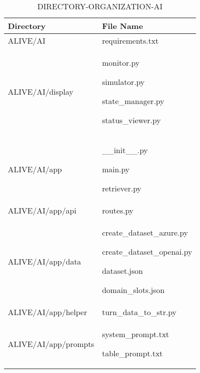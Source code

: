 \documentclass[conference]{IEEEtran}
\begin{document}
\begin{table}[h]
\caption{DIRECTORY-ORGANIZATION-AI}
\def\arraystretch{1.24} \small
    \begin{tabular}{|p{3.9cm}|p{4cm}|}
\hline
        Directory & File Name \\ \hline
        
          ALIVE/AI & 
          requirements.txt \\ \hline

          ALIVE/AI/display \par  &
           monitor.py \par 
           simulator.py \par
          state\_manager.py \par
          status\_viewer.py \\ \hline
          
          ALIVE/AI/app  &
          \_\_init\_\_.py \par 
          main.py \par retriever.py \\ \hline
          
          ALIVE/AI/app/api &
          routes.py \\ \hline
          
          ALIVE/AI/app/data \par  & create\_dataset\_azure.py \par create\_dataset\_openai.py \par 
          dataset.json \par 
          domain\_slots.json  \\ \hline
          
          ALIVE/AI/app/helper \par  &  turn\_data\_to\_str.py \\ \hline
          
          ALIVE/AI/app/prompts \par  & system\_prompt.txt \par 
          table\_prompt.txt \\ \hline
        
    \end{tabular}
\end{table}
\end{document}
